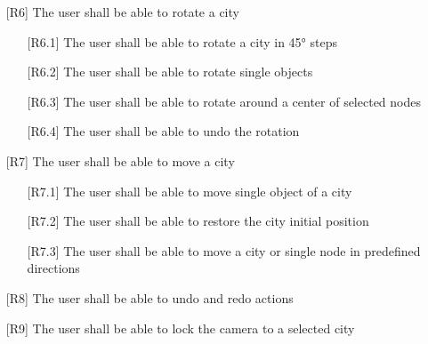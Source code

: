 \begin{itemize}
\begin{itemize}
    \end{itemize}
    \item[{[R6]}] The user shall be able to rotate a \gls{city}
    \begin{itemize}
        \item[{[R6.1]}] The user shall be able to rotate a \gls{city} in 45° steps
        \item[{[R6.2]}] The user shall be able to rotate single objects
        \item[{[R6.3]}] The user shall be able to rotate around a center of selected \glspl{node}
        \item[{[R6.4]}] The user shall be able to undo the rotation
    \end{itemize}
    \item[{[R7]}] The user shall be able to move a \gls{city}
    \begin{itemize}
        \item[{[R7.1]}] The user shall be able to move single object of a \gls{city}
        \item[{[R7.2]}] The user shall be able to restore the \gls{city} initial position
        \item[{[R7.3]}] The user shall be able to move a \gls{city} or single node in predefined directions
    \end{itemize}
    \item[{[R8]}] The user shall be able to undo and redo actions
    \item[{[R9]}] The user shall be able to lock the camera to a selected \gls{city}
\end{itemize}
